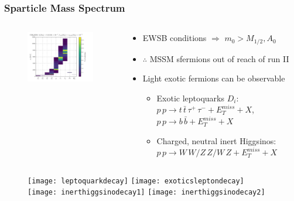 \documentclass[10pt,aspectratio=169]{beamer}
\begin{document}
\begin{frame}
  \frametitle{Sparticle Mass Spectrum}
  \begin{columns}[t]
    \begin{column}{0.4\textwidth}
      \vspace{-30pt}
      \begin{figure}
        \begin{center}
          \includegraphics[width=6.5cm]{cse6ssm_300GeV_mueff_spectrum}
        \end{center}
      \end{figure}
    \end{column}
    \begin{column}{0.6\textwidth}
      \begin{itemize} \itemsep1em
        \vfill
      \item EWSB conditions $\Rightarrow$ $m_0 > M_{1/2}, A_0$
        \vfill
      \item $\therefore$ MSSM sfermions out of reach of run II
        \vfill
      \item {\color{blue} Light exotic fermions can be observable}
        \vfill
        \begin{itemize} \itemsep0.8em
          \vfill
        \item Exotic leptoquarks $D_i$: $p\,p \to t\,\bar{t}
          \,\tau^+\,\tau^-+E_T^{miss}+X$,
          $p\,p \to b\,\bar{b} + E_T^{miss} + X$
        \item Charged, neutral inert Higgsinos: $p\,p\to W\,W / Z\,Z
          / W\,Z +E_T^{miss}+X$
        \end{itemize}
        \vfill
      \end{itemize}
    \end{column}
  \end{columns}
  \vspace{5pt}
  \begin{center}
    \begin{figure}
      \texttt{[image: leptoquarkdecay]}
      \hspace{40pt}
      \texttt{[image: exoticsleptondecay]}
      \hspace{40pt}
      \texttt{[image: inerthiggsinodecay1]}
      \hspace{40pt}
      \texttt{[image: inerthiggsinodecay2]}
    \end{figure}
  \end{center}
\end{frame}
\end{document}

